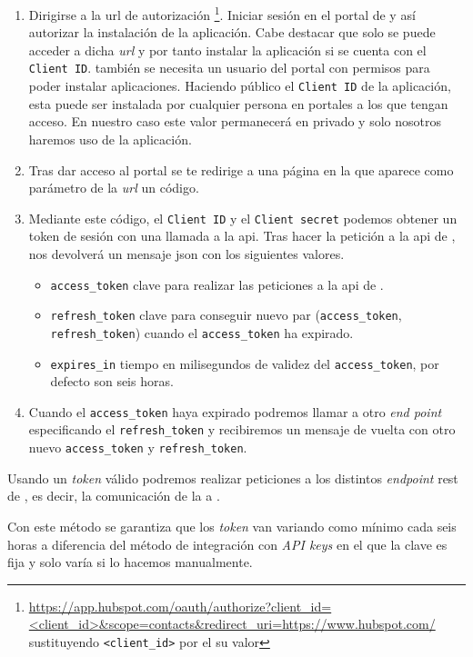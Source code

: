 \begin{enumerate}
	\item Dirigirse a la url de autorización \footnote{\url{https://app.hubspot.com/oauth/authorize?client_id=<client_id>&scope=contacts&redirect_uri=https://www.hubspot.com/} sustituyendo \texttt{<client\_id>} por el su valor}.
	Iniciar sesión en el portal de \hs{} y así autorizar la instalación de la aplicación. Cabe destacar que solo se puede acceder a dicha \textit{url} y por tanto instalar la aplicación si se cuenta con el \texttt{Client ID}. también se necesita un usuario del portal con permisos para poder instalar aplicaciones.
	Haciendo público el \texttt{Client ID} de la aplicación, esta puede ser instalada por cualquier persona en portales a los que tengan acceso. En nuestro caso este valor permanecerá en privado y solo nosotros haremos uso de la aplicación.
		
	\item Tras dar acceso al portal se te redirige a una página en la que aparece como parámetro de la \textit{url} un código.
	\item Mediante este código, el \texttt{Client ID} y el \texttt{Client secret} podemos obtener un token de sesión con una llamada a la \acrshort{api}.
	Tras hacer la petición a la \acrshort{api} de \hs{}, nos devolverá un mensaje \acrshort{json} con los siguientes valores.
		\begin{itemize}
			\item \texttt{access\_token} clave para realizar las peticiones a la \acrshort{api} de \hs{}.
			\item \texttt{refresh\_token} clave para conseguir nuevo par (\texttt{access\_token}, \texttt{refresh\_token}) cuando el \texttt{access\_token} ha expirado.
			\item \texttt{expires\_in} tiempo en milisegundos de validez del \texttt{access\_token}, por defecto son seis horas.
		\end{itemize}
	\item Cuando el \texttt{access\_token} haya expirado podremos llamar a otro \textit{end point} especificando el \texttt{refresh\_token} y recibiremos un mensaje de vuelta con otro nuevo \texttt{access\_token} y \texttt{refresh\_token}.
\end{enumerate}

Usando un \textit{token} válido podremos realizar peticiones a los distintos \textit{endpoint} \acrshort{rest} de \hs{}, es decir, la comunicación de la \iface{} a \hs{}.

Con este método se garantiza que los \textit{token} van variando como mínimo cada seis horas a diferencia del método de integración con \textit{API keys} en el que la  clave es fija y solo varía si lo hacemos manualmente. 

